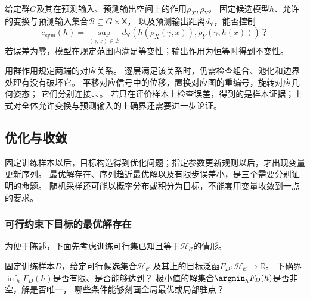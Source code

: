 \begin{mathproblem}[预测输入变换与预测输出对应的误差]
  \label{question:future-structural-property}
  给定群$G$及其在预测输入、预测输出空间上的作用$\rho_X,\rho_Y$，
  固定候选模型$h$、允许的变换与预测输入集合$\mathcal B\subseteq G\times\mathsf X$，
  以及预测输出距离$d_{\mathsf Y}$，能否控制
  \[
    e_{\mathrm{sym}}(h)=\sup_{(\gamma,x)\in\mathcal B}
    d_{\mathsf Y}\!\left(h(\rho_X(\gamma,x)),\rho_Y(\gamma,h(x))\right)\text{？}
  \]
  若误差为零，模型在规定范围内满足等变性；输出作用为恒等时得到不变性。
\end{mathproblem}

用群作用规定两端的对应关系。
逐层满足该关系时，仍需检查组合、池化和边界处理有没有破坏它。
平移对应信号中的位移，置换对应图的重编号，旋转对应几何姿态；
它们分别连接、、。
若只在评价样本上检查误差，得到的是样本证据；上式对全体允许变换与预测输入的上确界还需要进一步论证。

\subsection{优化与收敛}
\label{sec:future-objective-object-map}
\label{sec:future-iteration-object-map}

固定训练样本以后，目标构造得到优化问题；指定参数更新规则以后，才出现变量更新序列。
最优解存在、序列趋近最优解以及有限步误差小，是三个需要分别证明的命题。
随机采样还可能以概率分布或积分为目标，不能套用变量收敛到一点的要求。

\subsubsection{可行约束下目标的最优解存在}
\label{sec:future-analysis-minimizer}

为便于陈述，下面先考虑训练可行集已知且等于$\mathcal H_{\mathcal C}$的情形。

\begin{mathproblem}[目标泛函的极小值与解]
  \label{question:future-minimizer}
  固定训练样本$D$，给定可行候选集合$\mathcal H_{\mathcal C}$
  及其上的目标泛函$F_D:\mathcal H_{\mathcal C}\to\mathbb R$。
  下确界$\inf_hF_D(h)$是否有限、是否能够达到？
  极小值的解集合$\argmin_hF_D(h)$是否非空，解是否唯一，
  哪些条件能够刻画全局最优或局部驻点？
\end{mathproblem}

